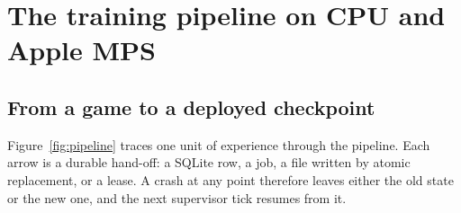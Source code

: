 \section{The training pipeline on CPU and Apple MPS}
\label{sec:pipeline}

\historyscope

\subsection{From a game to a deployed checkpoint}
Figure~\ref{fig:pipeline} traces one unit of experience through the pipeline.
Each arrow is a durable hand-off: a SQLite row, a job, a file written by
atomic replacement, or a lease. A crash at any point therefore leaves either
the old state or the new one, and the next supervisor tick resumes from it.

